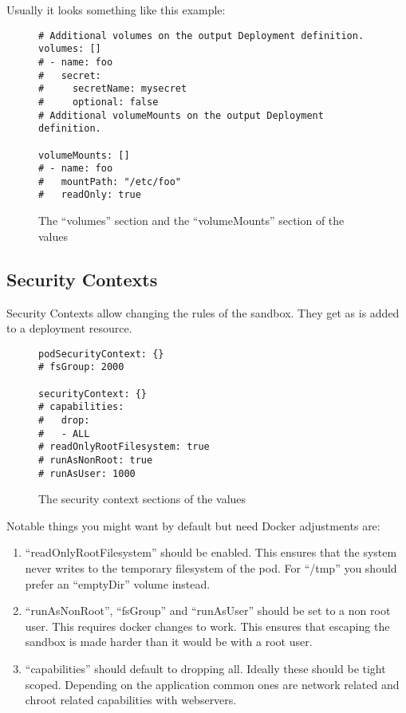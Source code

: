 Usually it looks something like this example:
\begin{figure}[h]
\begin{verbatim}
# Additional volumes on the output Deployment definition.
volumes: []
# - name: foo
#   secret:
#     secretName: mysecret
#     optional: false
# Additional volumeMounts on the output Deployment definition.

volumeMounts: []
# - name: foo
#   mountPath: "/etc/foo"
#   readOnly: true
\end{verbatim}
\caption{The \enquote{volumes} section and the \enquote{volumeMounts} section of the \gls{values}}\label{code:volumes_section}
\end{figure}

\subsection{Security Contexts}
Security Contexts allow changing the rules of the sandbox.
They get as is added to a \Gls{deployment resource}.

\begin{figure}[h]
\begin{verbatim}
podSecurityContext: {}
# fsGroup: 2000

securityContext: {}
# capabilities:
#   drop:
#   - ALL
# readOnlyRootFilesystem: true
# runAsNonRoot: true
# runAsUser: 1000
\end{verbatim}
\caption{The security context sections of the \gls{values}}\label{code:security_section}
\end{figure}

Notable things you might want by default but need Docker adjustments are:

\begin{enumerate}
	\item{
		\enquote{readOnlyRootFilesystem} should be enabled.
		This ensures that the system never writes to the temporary filesystem of the pod.
		For \enquote{/tmp} you should prefer an \enquote{emptyDir} volume instead.
	}
	\item{
		\enquote{runAsNonRoot}, \enquote{fsGroup} and \enquote{runAsUser} should be set to a non root user.
		This requires docker changes to work.
		This ensures that escaping the sandbox is made harder than it would be with a root user.
	}
	\item{
		\enquote{capabilities} should default to dropping all.
		Ideally these should be tight scoped.
		Depending on the application common ones are network related and chroot related capabilities with webservers.
	}
\end{enumerate}

